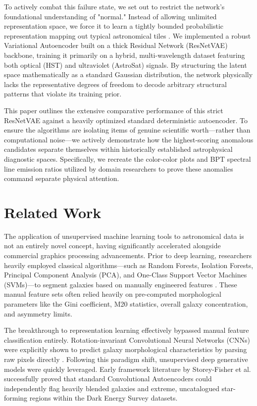 \documentclass[conference]{IEEEtran}
\begin{document}
To actively combat this failure state, we set out to restrict the network's foundational understanding of "normal." Instead of allowing unlimited representation space, we force it to learn a tightly bounded probabilistic representation mapping out typical astronomical tiles \cite{Lin2024}. We implemented a robust Variational Autoencoder built on a thick Residual Network (ResNetVAE) backbone, training it primarily on a hybrid, multi-wavelength dataset featuring both optical (HST) and ultraviolet (AstroSat) signals. By structuring the latent space mathematically as a standard Gaussian distribution, the network physically lacks the representative degrees of freedom to decode arbitrary structural patterns that violate its training prior. 

This paper outlines the extensive comparative performance of this strict ResNetVAE against a heavily optimized standard deterministic autoencoder. To ensure the algorithms are isolating items of genuine scientific worth—rather than computational noise—we actively demonstrate how the highest-scoring anomalous candidates separate themselves within historically established astrophysical diagnostic spaces. Specifically, we recreate the color-color plots and BPT spectral line emission ratios \cite{Kewley2001, Kauffmann2003} utilized by domain researchers to prove these anomalies command separate physical attention.

\section{Related Work}
The application of unsupervised machine learning tools to astronomical data is not an entirely novel concept, having significantly accelerated alongside commercial graphics processing advancements. Prior to deep learning, researchers heavily employed classical algorithms—such as Random Forests, Isolation Forests, Principal Component Analysis (PCA), and One-Class Support Vector Machines (SVMs)—to segment galaxies based on manually engineered features \cite{Baron2017}. These manual feature sets often relied heavily on pre-computed morphological parameters like the Gini coefficient, M20 statistics, overall galaxy concentration, and asymmetry limits.

The breakthrough to representation learning effectively bypassed manual feature classification entirely. Rotation-invariant Convolutional Neural Networks (CNNs) were explicitly shown to predict galaxy morphological characteristics by parsing raw pixels directly \cite{Dieleman2015}. Following this paradigm shift, unsupervised deep generative models were quickly leveraged. Early framework literature by Storey-Fisher et al. \cite{Storey2021} successfully proved that standard Convolutional Autoencoders could independently flag heavily blended galaxies and extreme, uncatalogued star-forming regions within the Dark Energy Survey datasets. 
\end{document}

